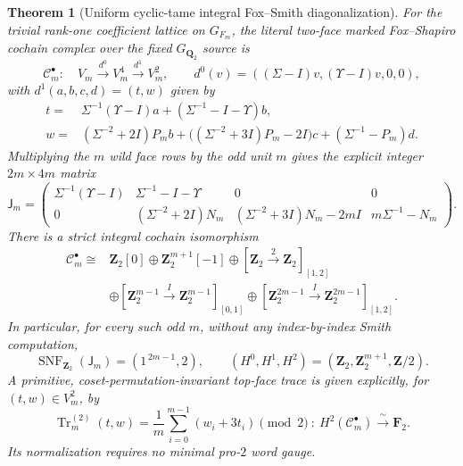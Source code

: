 \documentclass[11pt]{article}
\newtheorem{theorem}{Theorem}[section]
\theoremstyle{definition}
\begin{document}
\begin{theorem}[Uniform cyclic-tame integral Fox--Smith diagonalization]
For the trivial rank-one coefficient lattice on $G_{F_m}$,
the literal two-face marked Fox--Shapiro cochain complex
over the fixed $G_{\mathbf Q_2}$ source is
\[
\mathscr C_m^\bullet:
\quad V_m\xrightarrow{d^0}V_m^4\xrightarrow{d^1}V_m^2,
\qquad
d^0(v)=((\Sigma-I)v,(\Upsilon-I)v,0,0),
\]
with $d^1(a,b,c,d)=(t,w)$ given by
\begin{equation}\label{eq:dyadic-f136-cyclic-tame-fox-rows}
\boxed{
\begin{aligned}
t={}&\Sigma^{-1}(\Upsilon-I)a+
       (\Sigma^{-1}-I-\Upsilon)b,\\
w={}&(\Sigma^{-2}+2I)P_m b+
       \bigl((\Sigma^{-2}+3I)P_m-2I\bigr)c+
       (\Sigma^{-1}-P_m)d .
\end{aligned}}
\end{equation}
Multiplying the $m$ wild face rows by the odd unit $m$
gives the explicit \emph{integer} $2m\times4m$ matrix
\begin{equation}\label{eq:dyadic-f136-cyclic-tame-integer-fox}
\boxed{
\mathsf J_m=
\begin{pmatrix}
\Sigma^{-1}(\Upsilon-I)&\Sigma^{-1}-I-\Upsilon&0&0\\
0&(\Sigma^{-2}+2I)N_m&
   (\Sigma^{-2}+3I)N_m-2mI&m\Sigma^{-1}-N_m
\end{pmatrix}.
}
\end{equation}
There is a strict integral cochain \emph{isomorphism}
\begin{equation}\label{eq:dyadic-f136-cyclic-tame-strict-normal}
\boxed{
\begin{aligned}
\mathscr C_m^\bullet\cong {}&
\mathbf Z_2[0]\oplus\mathbf Z_2^{m+1}[-1]
\oplus [\mathbf Z_2\xrightarrow{\,2\,}\mathbf Z_2]_{[1,2]}\\
&\oplus[\mathbf Z_2^{m-1}\xrightarrow{I}
          \mathbf Z_2^{m-1}]_{[0,1]}
 \oplus[\mathbf Z_2^{2m-1}\xrightarrow{I}
          \mathbf Z_2^{2m-1}]_{[1,2]} .
\end{aligned}}
\end{equation}
In particular, \emph{for every such odd $m$}, without any
index-by-index Smith computation,
\begin{equation}\label{eq:dyadic-f136-cyclic-tame-smith}
\boxed{\quad
\operatorname{SNF}_{\mathbf Z_2}(\mathsf J_m)
  =(1^{\,2m-1},2),\qquad
(H^0,H^1,H^2)
  =(\mathbf Z_2,\mathbf Z_2^{m+1},\mathbf Z/2).
\quad}
\end{equation}
A primitive, coset-permutation-invariant top-face trace
is given explicitly, for $(t,w)\in V_m^2$, by
\begin{equation}\label{eq:dyadic-f136-cyclic-tame-toptrace}
\boxed{\quad
\operatorname{Tr}^{(2)}_m(t,w)
=\frac1m\sum_{i=0}^{m-1}(w_i+3t_i)
\pmod {2}\ :\
H^2(\mathscr C_m^\bullet)\xrightarrow{\ \sim\ }\mathbf F_2 .
\quad}
\end{equation}
Its normalization requires no minimal pro-$2$ word gauge.
\end{theorem}
\end{document}
